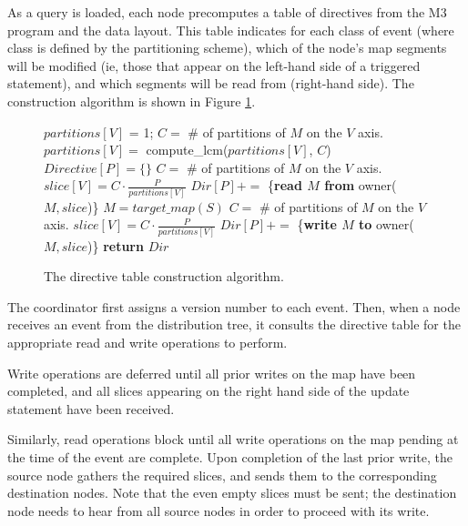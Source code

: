 \documentclass{vldb}
\begin{document}
As a query is loaded, each node precomputes a table of directives from the M3 program and the data layout.  This table indicates for each class of event (where class is defined by the partitioning scheme), which of the node's map segments will be modified (ie, those that appear on the left-hand side of a triggered statement), and which segments will be read from (right-hand side).  The construction algorithm is shown in Figure \ref{fig:directiveconstruction}.

\begin{figure}
\begin{algorithmic}[1]
  \STATE $partitions[V]$ = 1;
    \STATE {}
    \STATE $C =$ \# of partitions of $M$ on the $V$ axis.
    \STATE $partitions[V] =$ compute\_lcm($partitions[V]$, $C$)
  \ENDFOR
\ENDFOR
{}
  \STATE $Directive[P] = \{\}$
      \STATE $C =$ \# of partitions of $M$ on the $V$ axis.
      \STATE $slice[V] = C\cdot\frac{P}{partitions[V]}$
    \ENDFOR
    \STATE {}
    \STATE $Dir[P] +=$ \{\textbf{read $M$ from} owner($M, slice$)\}
  \ENDFOR
  \STATE $M = target\_map(S)$
    \STATE $C =$ \# of partitions of $M$ on the $V$ axis.
    \STATE $slice[V] = C\cdot\frac{P}{partitions[V]}$
  \ENDFOR
  \STATE $Dir[P] +=$ \{\textbf{write $M$ to} owner($M, slice$)\}
\ENDFOR
\STATE \textbf{return} $Dir$
\end{algorithmic}
\caption{The directive table construction algorithm.}
\label{fig:directiveconstruction}
\end{figure}

The coordinator first assigns a version number to each event.  Then, when a node receives an event from the distribution tree, it consults the directive table for the appropriate read and write operations to perform.  

Write operations are deferred until all prior writes on the map have been completed, and all slices appearing on the right hand side of the update statement have been received.  

Similarly, read operations block until all write operations on the map pending at the time of the event are complete.  Upon completion of the last prior write, the source node gathers the required slices, and sends them to the corresponding destination nodes.  Note that the even empty slices must be sent; the destination node needs to hear from all source nodes in order to proceed with its write.
\end{document}
